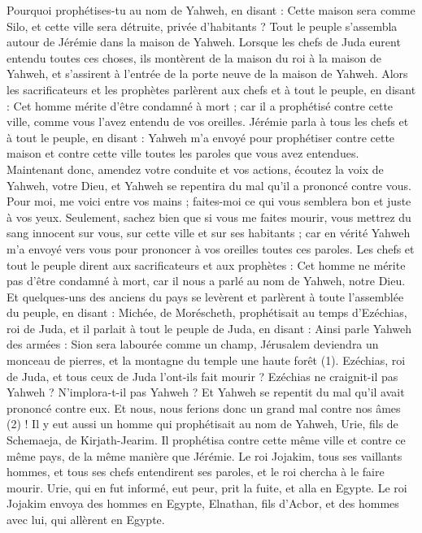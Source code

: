 \begin{multicols}{2}
Pourquoi prophétises-tu au nom de Yahweh, en disant : Cette maison sera comme Silo, et cette ville sera détruite, privée d’habitants ? Tout le peuple s'assembla autour de Jérémie dans la maison de Yahweh.
Lorsque les chefs de Juda eurent entendu toutes ces choses, ils montèrent de la maison du roi à la maison de Yahweh, et s'assirent à l'entrée de la porte neuve de la maison de Yahweh.
Alors les sacrificateurs et les prophètes parlèrent aux chefs et à tout le peuple, en disant : Cet homme mérite d'être condamné à mort ; car il a prophétisé contre cette ville, comme vous l'avez entendu de vos oreilles.
Jérémie parla à tous les chefs et à tout le peuple, en disant : Yahweh m'a envoyé pour prophétiser contre cette maison et contre cette ville toutes les paroles que vous avez entendues.
Maintenant donc, amendez votre conduite et vos actions, écoutez la voix de Yahweh, votre Dieu, et Yahweh se repentira du mal qu'il a prononcé contre vous.
Pour moi, me voici entre vos mains ; faites-moi ce qui vous semblera bon et juste à vos yeux.
Seulement, sachez bien que si vous me faites mourir, vous mettrez du sang innocent sur vous, sur cette ville et sur ses habitants ; car en vérité Yahweh m'a envoyé vers vous pour prononcer à vos oreilles toutes ces paroles.
Les chefs et tout le peuple dirent aux sacrificateurs et aux prophètes : Cet homme ne mérite pas d'être condamné à mort, car il nous a parlé au nom de Yahweh, notre Dieu.
Et quelques-uns des anciens du pays se levèrent et parlèrent à toute l'assemblée du peuple, en disant :
Michée, de Moréscheth, prophétisait au temps d'Ezéchias, roi de Juda, et il parlait à tout le peuple de Juda, en disant : Ainsi parle Yahweh des armées : Sion sera labourée comme un champ, Jérusalem deviendra un monceau de pierres, et la montagne du temple une haute forêt\FTNT{} (1).
Ezéchias, roi de Juda, et tous ceux de Juda l’ont-ils fait mourir ? Ezéchias ne craignit-il pas Yahweh ? N’implora-t-il pas Yahweh ? Et Yahweh se repentit du mal qu'il avait prononcé contre eux. Et nous, nous ferions donc un grand mal contre nos âmes\FTNT{} (2) !
Il y eut aussi un homme qui prophétisait au nom de Yahweh, Urie, fils de Schemaeja, de Kirjath-Jearim. Il prophétisa contre cette même ville et contre ce même pays, de la même manière que Jérémie.
Le roi Jojakim, tous ses vaillants hommes, et tous ses chefs entendirent ses paroles, et le roi chercha à le faire mourir. Urie, qui en fut informé, eut peur, prit la fuite, et alla en Egypte.
Le roi Jojakim envoya des hommes en Egypte, Elnathan, fils d’Acbor, et des hommes avec lui, qui allèrent en Egypte.

\end{multicols}
